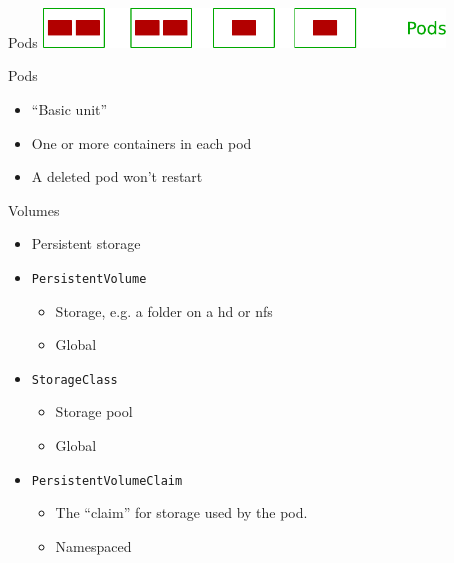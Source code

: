 \documentclass{dcpresentation}
\begin{document}
  \begin{frame}{Pods}
  \centering
  \includegraphics[width=0.8\textwidth]{img/arch-p.pdf}
 \end{frame}
 
 \begin{frame}{Pods}
  \begin{itemize}
   \item ``Basic unit''
   \item One or more containers in each pod
   \item A deleted pod won't restart
  \end{itemize}
 \end{frame}
 
 
 \begin{frame}{Volumes}
  \begin{itemize}
   \item Persistent storage
   \item \texttt{PersistentVolume}
   \begin{itemize}
    \item Storage, e.g. a folder on a hd or nfs
    \item Global
   \end{itemize}
   \item \texttt{StorageClass}
   \begin{itemize}
    \item Storage pool
    \item Global
   \end{itemize}
   \item \texttt{PersistentVolumeClaim}
   \begin{itemize}
    \item The ``claim'' for storage used by the pod.
    \item Namespaced
   \end{itemize}
  \end{itemize}
 \end{frame}
\end{document}
